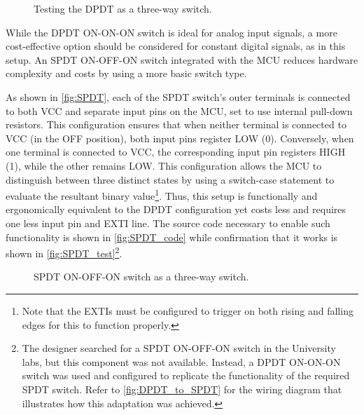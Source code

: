\documentclass[12pt]{article}
\numberwithin{subsubsubsection}{subsubsection}
\begin{document}
\begin{figure}[H]
    \centering
    \caption{Testing the DPDT as a three-way switch.}
    \label{fig:DPDT}
\end{figure}


While the DPDT ON-ON-ON switch is ideal for analog input signals, a more cost-effective option should be considered for constant digital signals, as in this setup.  An SPDT ON-OFF-ON switch integrated with the MCU reduces hardware complexity and costs by using a more basic switch type. 

As shown in \autoref{fig:SPDT}, each of the SPDT switch's outer terminals is connected to both VCC and separate input pins on the MCU, set to use internal pull-down resistors. This configuration ensures that when neither terminal is connected to VCC (in the OFF position), both input pins register LOW (0). Conversely, when one terminal is connected to VCC, the corresponding input pin registers HIGH (1), while the other remains LOW. This configuration allows the MCU to distinguish between three distinct states by using a switch-case statement to evaluate the resultant binary value\footnote{Note that the EXTIs must be configured to trigger on both rising and falling edges for this to function properly.}. Thus, this setup is functionally and ergonomically equivalent to the DPDT configuration yet costs less and requires one less input pin and EXTI line. The source code necessary to enable such functionality is shown in \autoref{fig:SPDT_code} while confirmation that it works is shown in \autoref{fig:SPDT_test}\footnote{The designer searched for a SPDT ON-OFF-ON switch in the University labs, but this component was not available. Instead, a DPDT ON-ON-ON switch was used and configured to replicate the functionality of the required SPDT switch. Refer to \autoref{fig:DPDT_to_SPDT} for the wiring diagram that illustrates how this adaptation was achieved.}.

\begin{figure}[H]
    \centering
    \caption{SPDT ON-OFF-ON switch as a three-way switch.}
    \label{fig:SPDT}
\end{figure}
\end{document}
